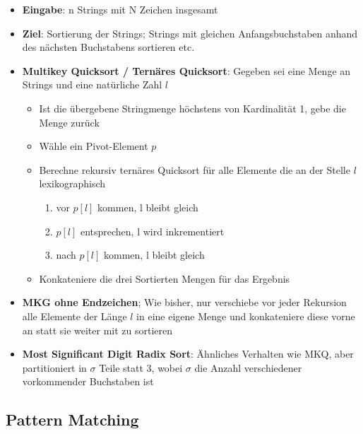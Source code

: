 \documentclass[10pt,a4paper]{article}
\begin{document}
	\begin{itemize}
		\item \textbf{Eingabe}: n Strings mit N Zeichen insgesamt
		\item \textbf{Ziel}: Sortierung der Strings; Strings mit gleichen Anfangsbuchstaben anhand des nächsten Buchstabens sortieren etc.
		\item \textbf{Multikey Quicksort / Ternäres Quicksort}: Gegeben sei eine Menge an Strings und eine natürliche Zahl $l$
		\begin{itemize}
			\item Ist die übergebene Stringmenge höchstens von Kardinalität 1, gebe die Menge zurück
			\item Wähle  ein Pivot-Element $p$
			\item Berechne rekursiv ternäres Quicksort für alle Elemente die an der Stelle $l$ lexikographisch
			\begin{enumerate}
				\item vor $p[l]$ kommen, l bleibt gleich
				\item $p[l]$ entsprechen, l wird inkrementiert
				\item nach $p[l]$ kommen, l bleibt gleich
			\end{enumerate}
			\item Konkateniere die drei Sortierten Mengen für das Ergebnis
		\end{itemize}
		\item \textbf{MKG ohne Endzeichen}; Wie bisher, nur verschiebe vor jeder Rekursion alle Elemente der Länge $l$ in eine eigene Menge und konkateniere diese vorne an statt sie weiter mit zu sortieren
		\item \textbf{Most Significant Digit Radix Sort}: Ähnliches Verhalten wie MKQ, aber partitioniert in $\sigma$ Teile statt 3, wobei $\sigma$ die Anzahl verschiedener vorkommender Buchstaben ist
	\end{itemize}

	\subsection{Pattern Matching}
	\label{str:sub:pattern_matching}
	
\end{document}

